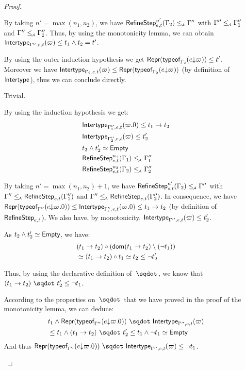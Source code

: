 \documentclass[a4paper]{article}
\theoremstyle{definition}
\begin{document}
\begin{proof}
\begin{description}
\begin{description}
      By taking $n'=\max (n_1,n_2)$,
      we have $\RefineStep {e,t}^{n'} (\Gamma_2) \leqA \Gamma''$ with $\Gamma'' \leqA \Gamma_1''$ and $\Gamma'' \leqA \Gamma_2''$.
      Thus, by using the monotonicity lemma, we can obtain $\env {\Gamma'',e,t} (\varpi) \leq t_1 \land t_2 = t'$.
      \item[\Rule{PTypeof}] By using the outer induction hypothesis we get
      $\tsrep{\tyof {\occ e \varpi} {\Gamma_2}} \leq t'$.
      Moreover we have $\env {\Gamma_2,e,t} (\varpi) \leq \tsrep{\tyof {\occ e \varpi} {\Gamma_2}}$
      (by definition of $\env {}$), thus we can conclude directly.
      \item[\Rule{PEps}] Trivial.
       
      \item[\Rule{PAppR}] By using the induction hypothesis we get:
      \begin{align*}
        &\env {\Gamma_1'',e,t} (\varpi.0) \leq \arrow {t_1} {t_2}\\
        &\env {\Gamma_2'',e,t} (\varpi) \leq t_2'\\
        & t_2\land t_2' \simeq \Empty\\
        &\RefineStep {e,t}^{n_1} (\Gamma_1) \leqA \Gamma_1''\\
        &\RefineStep {e,t}^{n_2} (\Gamma_2) \leqA \Gamma_2''
      \end{align*}
      
      By taking $n'=\max (n_1,n_2) + 1$,
      we have $\RefineStep {e,t}^{n'} (\Gamma_2) \leqA \Gamma''$ with $\Gamma'' \leqA \RefineStep {e,t} (\Gamma_1'')$
      and $\Gamma'' \leqA \RefineStep {e,t} (\Gamma_2'')$.
      In consequence, we have $\tsrep{\tyof {\occ e {\varpi.0}} {\Gamma''}} \leq \env {\Gamma_1'',e,t} (\varpi.0) \leq \arrow {t_1} {t_2}$
      (by definition of $\RefineStep {e,t}$).
      We also have, by monotonicity, $\env {\Gamma'',e,t} (\varpi) \leq t_2'$.

      As $t_2\land t_2' \simeq \Empty$, we have:
      \begin{align*}
        &\apply {(\arrow {t_1} {t_2})} {(\dom{\arrow {t_1} {t_2}}\setminus(\neg t_1))}\\
        &\simeq \apply {(\arrow {t_1} {t_2})} {t_1} \simeq t_2 \leq \neg t_2'
      \end{align*}

      Thus, by using the declarative definition of $\worra {} {}$, we know that
      $\worra {(\arrow {t_1} {t_2})} {t_2'} \leq \neg t_1$.

      According to the properties on $\worra {} {}$ that we have proved in the proof of the monotonicity lemma,
      we can deduce:
      \begin{align*}
      &t_1 \land \worra {\tsrep{\tyof {\occ e {\varpi.0}} {\Gamma''}}} {\env {\Gamma'',e,t} (\varpi)}\\
      &\leq t_1 \land \worra {(\arrow {t_1} {t_2})} {t_2'} \leq t_1 \land \neg t_1 \simeq \Empty
      \end{align*}
      And thus $\worra {\tsrep{\tyof {\occ e {\varpi.0}} {\Gamma''}}} {\env {\Gamma'',e,t} (\varpi)} \leq \neg t_1$.


\end{description}
\end{description}
\end{proof}
\end{document}
